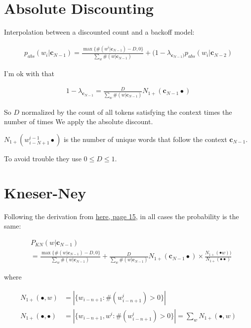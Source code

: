 \documentclass{article}
\newcommand{\context}{\boldsymbol{c}}
\begin{document}
\section{Absolute Discounting}

	Interpolation between a discounted count and a backoff model:
	
	\begin{align}
		p_{abs}(w_i|\context_{N-1}) = \frac{\max\{\#(w^i|\context_{N-1}) - D, 0 \}}{\sum_w \#(w|\context_{N-1})} + (1-\lambda_{\context_{N-1})} p_{abs}(w_i|\context_{N-2})
	\end{align}
		
	I'm ok with that
	
	\begin{align}
		1-\lambda_{\context_{N-1}} = \frac{D}{\sum_w \#(w|\context_{N-1})} N_{1+} (\context_{N-1}\bullet)
	\end{align}
	
	So $D$ normalized by the count of all tokens satisfying the context times the number of times We apply the absolute discount.
	
	$N_{1+} (w^{i-1}_{i-N+1}\bullet)$ is the number of unique words that follow the context $\context_{N-1}$.
	
	To avoid trouble they use $0 \le D \le 1$.
	
\newpage
\section{Kneser-Ney}

	Following the derivation from \href{https://dash.harvard.edu/bitstream/handle/1/25104739/tr-10-98.pdf}{here, page 15}, in all cases the probability is the same:
	
	\begin{align}
		&P_{KN}(w|\context_{N-1}) \\
		&= \frac{\max\{\#(w|\context_{N-1}) - D, 0 \}}{\sum_w \#(w|\context_{N-1})} + \frac{D}{\sum_w \#(w|\context_{N-1})} N_{1+} (\context_{N-1}\bullet) \times \frac{N_{1+}(\bullet w))}{N_{1+}(\bullet \bullet)}
	\end{align}
	
	where
	
	\begin{align}
		N_{1+}(\bullet, w) &= |\{w_{i-n+1} : \#(w^i_{i-n+1} ) > 0	\} |\\
		N_{1+}(\bullet, \bullet) &= |\{w_{i-n+1}, w^i : \#(w^i_{i-n+1} ) > 0	\} | = \sum_w N_{1+}(\bullet, w)
	\end{align}
	
\end{document}
